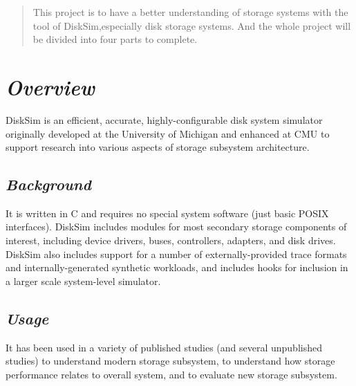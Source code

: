 \documentclass[conference]{IEEEtran}
\begin{document}




\maketitle

\begin{abstract}
This project is to have a better understanding of storage systems with the tool of DiskSim,especially disk storage systems. And the whole project will be divided into four parts to complete.
\end{abstract}





%
\IEEEpeerreviewmaketitle



\section{\emph{\textbf{Overview}}}
DiskSim is an efficient, accurate, highly-configurable disk system simulator originally developed at the University of Michigan and enhanced at CMU to support research into various aspects of storage subsystem architecture.

\subsection{\emph{\textbf{Background}}}
It is written in C and requires no special system software (just basic POSIX interfaces). DiskSim includes modules for most secondary storage components of interest, including device drivers, buses, controllers, adapters, and disk drives. DiskSim also includes support for a number of externally-provided trace formats and internally-generated synthetic workloads, and includes hooks for inclusion in a larger scale system-level simulator.
\subsection{\emph{\textbf{Usage}}}
It has been used in a variety of published studies (and several unpublished studies) to understand modern storage subsystem, to understand how storage performance relates to overall system, and to evaluate new storage subsystem.
\end{document}
